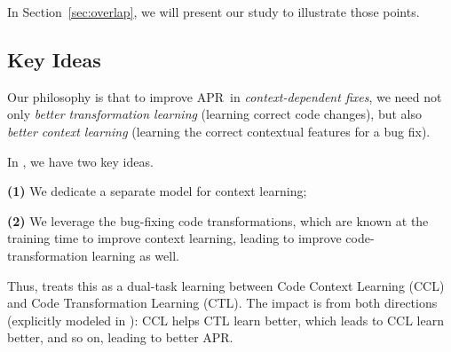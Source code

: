 %
In Section~\ref{sec:overlap}, we will present our study 
to illustrate those points.


\subsection{Key Ideas}
\label{sec:key-idea}


Our philosophy is that to improve APR~in {\em
  context-dependent fixes}, we need not only {\em better
  transformation learning} (learning correct code changes), but also
{\em better context learning} (learning the correct contextual
features for a bug fix).

In {\tool}, we have two key ideas.

{\bf (1)} We dedicate a separate model for context learning;

{\bf (2)} We leverage the bug-fixing code transformations, which
are known at the training time to improve context learning,
leading to improve code-transformation learning as well.

Thus, {\tool} treats this as a dual-task learning between Code
Context Learning (CCL) and Code Transformation Learning (CTL). The
impact is from both directions (explicitly modeled in {\tool}): CCL
helps CTL learn better, which leads to CCL learn better, and so on,
leading to better APR.







